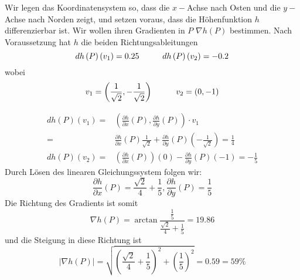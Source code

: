 \begin{enumerate}
Wir legen das Koordinatensystem so, dass die $x-$Achse nach Osten und die $y-$Achse nach Norden zeigt, und setzen voraus, dass die Höhenfunktion $h$ differenzierbar ist. Wir wollen ihren Gradienten in $P$ $\nabla h(P)$ bestimmen. Nach Voraussetzung hat $h$ die beiden Richtungsableitungen \[dh\left( P\right)\left( v_1\right)=0.25\hspace{10mm}dh\left( P\right)\left(  v_2\right)=-0.2\] wobei \[v_1=\left( \frac{1}{\sqrt{2}},-\frac{1}{\sqrt{2}}\right)\hspace{10mm}v_2=(0,-1)\]

\begin{center}
\end{center}


\begin{align*}
dh \left( P\right) \left( v_1\right) = &\left( \frac{\partial h}{\partial x}\left(P\right), \frac{\partial h}{\partial y}\left(P\right)\right)\cdot v_1\\
= & \frac{\partial h}{\partial x}\left(P\right)\frac{1}{\sqrt{2}} +\frac{\partial h}{\partial y}\left( P\right) \left(-\frac{1}{\sqrt{2}}\right) = \frac{1}{4}\\
dh \left( P\right) \left( v_2\right) = &\left( \frac{\partial h}{\partial x}\left(P\right)\right) (0) - \frac{\partial h}{\partial y}\left(P\right)(-1)=-\frac{1}{5}
\end{align*}
Durch Lösen des linearen Gleichungssystem folgen wir:
\[\frac{\partial h}{\partial x}\left( P\right) = \frac{\sqrt{2}}{4}+\frac{1}{5}, \frac{\partial h}{\partial y}\left( P\right) = \frac{1}{5}\]
Die Richtung des Gradients ist somit \[ \nabla h\left( P \right) = \arctan{\frac{\frac{1}{5}}{\frac{\sqrt{2}}{4}+ \frac{1}{5}}}=19.86 \]
und die Steigung in diese Richtung ist
\[\left| \nabla h\left( P\right) \right| = \sqrt{\left( \frac{\sqrt{2}}{4}+\frac{1}{5}\right)^2 + \left( \frac{1}{5}\right)^2} = 0.59 = 59\%\] 
\end{enumerate}

